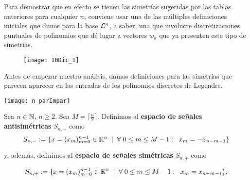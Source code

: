 Para demostrar que en efecto se tienen las simetrías
sugeridas por las tablas anteriores
para cualquier $n$,
conviene
usar una de las múltiples definiciones iniciales
que dimos para la base $\mathcal{L}^{n}$, a saber, una
que involucre discretizaciones puntuales de polinomios 
que dé lugar a vectores $w_{k}$ que ya presenten 
este tipo de simetrías.


\begin{figure}[H]
	\centering
	\texttt{[image: 10Dic\_1]} 
\end{figure}	

Antes de empezar nuestro análisis, damos definiciones
para las simetrías que parecen aparecer en las entradas
de los polinomios discretos de Legendre.

\begin{marginfigure}
\texttt{[image: n\_parImpar]} 
\end{marginfigure}


\begin{defi}
\label{def: espacios de seniales simetricas y antisimetricas}
Sea $n \in \mathbb{N}$, $n \geq 2$. 
Sea $M = \lceil \frac{n}{2} \rceil$.
Definimos al 
\textbf{espacio de señales antisimétricas} $S_{n,-}$ como 
	\begin{equation}
	\label{eq1: 5Dic}
	S_{n, -}:= \{ x=(x_{m})_{m=0}^{n-1}  \in \mathbb{R}^{n}
	\hspace{0.2cm} |
	\hspace{0.2cm} \forall  
	\hspace{0.1cm}
	0 \leq m \leq M-1 : \hspace{0.2cm} x_{m}= -x_{n-m-1}\}
	\end{equation}

\noindent	
y, además, definimos al
\textbf{espacio de señales simétricas} $S_{n,+}$ como 
 
	\begin{equation}
	\label{eq0: 5Dic}
	S_{n, +}:= \{ x=(x_{m})_{m=0}^{n-1} \in \mathbb{R}^{n} \hspace{0.2cm} 
	| \hspace{0.2cm} \forall  
	\hspace{0.1cm}
	0 \leq m \leq M-1 : \hspace{0.2cm} x_{m}= x_{n-m-1}\},
	\end{equation}
\end{defi}


